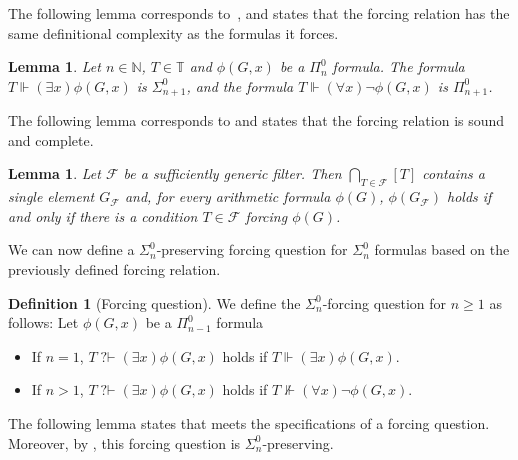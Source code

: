 \documentclass{article}
\def\NN{\mathbb{N}}
\def\TT{\mathbb{T}}
\def\F{\mathcal{F}}
\newcommand{\qvdash}{\operatorname{{?}{\vdash}}}
\numberwithin{theorem}{section}
\newtheorem{lemma}[theorem]{Lemma}
\theoremstyle{definition}
\newtheorem{definition}[theorem]{Definition}
\begin{document}
The following lemma corresponds to~\cite[Lemma 3.13]{wang2016definability}, and states that the forcing relation has the same definitional complexity as the formulas it forces.

\begin{lemma}\label{lem:tree-forcing-relation-preserving}
    Let $n \in \NN$, $T \in \TT$ and $\phi(G,x)$ be a $\Pi_n^0$ formula. The formula $T \Vdash (\exists x)\phi(G,x)$ is $\Sigma_{n+1}^0$, and the formula  $T \Vdash (\forall x)\neg \phi(G,x)$ is $\Pi_{n+1}^0$.
\end{lemma}

The following lemma corresponds to \cite[Lemma 3.12]{wang2016definability}
and states that the forcing relation is sound and complete.

\begin{lemma}
Let $\F$ be a sufficiently generic filter. Then $\bigcap_{T \in \F} [T]$ contains a single element $G_{\F}$ and, for every arithmetic formula $\phi(G)$, $\phi(G_{\F})$ holds if and only if there is a condition $T \in \F$ forcing $\phi(G)$.
\end{lemma}

We can now define a $\Sigma^0_n$-preserving forcing question for $\Sigma^0_n$ formulas based on
the previously defined forcing relation.

\begin{definition}[Forcing question]\label{def:tree-forcing-question}
We define the $\Sigma_n^0$-forcing question for $n \geq 1$ as follows: Let $\phi(G,x)$ be a $\Pi_{n-1}^0$ formula
\begin{itemize}
    \item If $n = 1$, $T \qvdash (\exists x)\phi(G,x)$ holds if $T \Vdash (\exists x)\phi(G,x)$.
    \item If $n > 1$, $T \qvdash (\exists x) \phi(G,x)$ holds if $T \not \Vdash (\forall x) \neg \phi(G,x)$.
\end{itemize}   
\end{definition}

The following lemma states that  meets the specifications of a forcing question. 
Moreover, by , this forcing question is $\Sigma^0_n$-preserving. 
\end{document}
